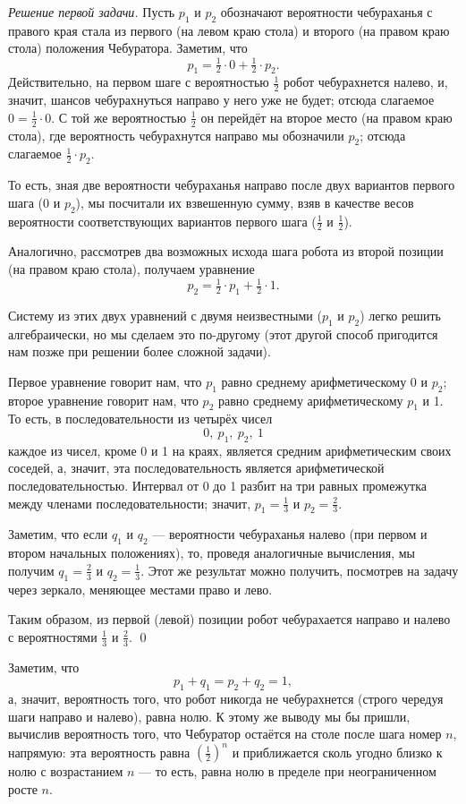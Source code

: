 \documentclass{article}
\begin{document}
\medskip
\noindent\textit{Решение первой задачи.}
Пусть $p_1$ и $p_2$ обозначают вероятности чебураханья с правого края стала из первого (на левом краю стола) и второго (на правом краю стола) положения Чебуратора.
Заметим, что
\[p_1=\tfrac12\cdot0+\tfrac12\cdot p_2.\]
Действительно, на первом шаге с вероятностью $\tfrac12$ робот чебурахнется налево,
и, значит, шансов чебурахнуться направо у него уже не будет; 
отсюда слагаемое $0=\tfrac12\cdot0$. С той же вероятностью $\tfrac12$ он перейдёт на второе место (на правом краю стола), где вероятность чебурахнутся направо мы обозначили $p_2$; отсюда слагаемое $\tfrac12\cdot p_2$. 

То есть, зная две вероятности чебураханья направо после двух вариантов первого шага (0 и $p_2$), мы посчитали их взвешенную сумму, взяв в качестве весов вероятности соответствующих вариантов первого шага ($\tfrac12$ и $\tfrac12$).

Аналогично, рассмотрев два возможных исхода шага робота из второй позиции (на правом краю стола), получаем уравнение 
\[p_2=\tfrac12\cdot p_1+\tfrac12\cdot 1.\]

Систему из этих двух уравнений с двумя неизвестными ($p_1$ и $p_2$) легко решить алгебраически, но мы сделаем это по-другому (этот другой способ пригодится нам позже при решении более сложной задачи). 

Первое уравнение говорит нам, что $p_1$ равно среднему арифметическому 0 и $p_2$; второе уравнение говорит нам, что $p_2$ равно среднему арифметическому $p_1$ и 1. То есть, в последовательности из четырёх чисел
\[0,\  p_1,\  p_2,\ 1\]
каждое из чисел, кроме 0 и 1 на краях, является средним арифметическим своих соседей, а, значит, эта последовательность является арифметической последовательностью. Интервал от 0 до 1 разбит на три равных промежутка между членами последовательности; значит, $p_1=\tfrac13$ и $p_2=\tfrac23$.

Заметим, что если $q_1$ и $q_2$ --- вероятности чебураханья налево (при первом и втором начальных положениях), 
то, проведя аналогичные вычисления, мы получим $q_1=\tfrac23$ и $q_2=\tfrac13$.
Этот же результат можно получить, посмотрев на задачу через зеркало, меняющее местами право и лево.

Таким образом, из первой (левой) позиции робот чебурахается направо и налево с вероятностями $\tfrac13$ и $\tfrac23$.
\qed
\medskip

Заметим, что 
\[p_1+q_1=p_2+q_2=1,\]
а, значит, вероятность того, что робот никогда не чебурахнется (строго чередуя шаги направо и налево), равна нолю. К этому же выводу мы бы пришли, вычислив вероятность того, что Чебуратор остаётся на столе после шага номер $n$, напрямую: эта вероятность равна $(\tfrac12)^n$ и приближается сколь угодно близко к нолю с возрастанием $n$ --- то есть, равна нолю в пределе при неограниченном росте $n$.
\medskip
\end{document}
